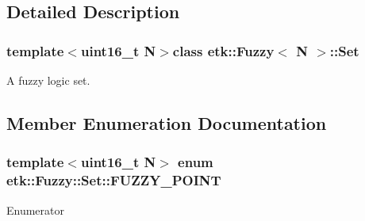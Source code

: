 \subsection{Detailed Description}
\subsubsection*{template$<$uint16\-\_\-t N$>$class etk\-::\-Fuzzy$<$ N $>$\-::\-Set}

A fuzzy logic set. 

\subsection{Member Enumeration Documentation}
\hypertarget{classetk_1_1_fuzzy_1_1_set_a458bba0e19aa05ab891962a705243a97}{
\subsubsection[{F\-U\-Z\-Z\-Y\-\_\-\-P\-O\-I\-N\-T}]{\setlength{\rightskip}{0pt plus 5cm}template$<$uint16\-\_\-t N$>$ enum {\bf etk\-::\-Fuzzy\-::\-Set\-::\-F\-U\-Z\-Z\-Y\-\_\-\-P\-O\-I\-N\-T}\hspace{0.3cm}{\ttfamily [protected]}}}\label{classetk_1_1_fuzzy_1_1_set_a458bba0e19aa05ab891962a705243a97}
\begin{Desc}
\item[Enumerator]\par
\begin{description}
\item[{\em 
\hypertarget{classetk_1_1_fuzzy_1_1_set_a458bba0e19aa05ab891962a705243a97ac8fc7790d2c5d6719b755e21658d60f5}{S\-T\-A\-R\-T}\label{classetk_1_1_fuzzy_1_1_set_a458bba0e19aa05ab891962a705243a97ac8fc7790d2c5d6719b755e21658d60f5}
}]\item[{\em 
\hypertarget{classetk_1_1_fuzzy_1_1_set_a458bba0e19aa05ab891962a705243a97a622f9b497afa3b59681c1875936788ee}{M\-I\-D}\label{classetk_1_1_fuzzy_1_1_set_a458bba0e19aa05ab891962a705243a97a622f9b497afa3b59681c1875936788ee}
}]\item[{\em 
\hypertarget{classetk_1_1_fuzzy_1_1_set_a458bba0e19aa05ab891962a705243a97a58517baf34b39d08da1c1a184d872856}{E\-N\-D}\label{classetk_1_1_fuzzy_1_1_set_a458bba0e19aa05ab891962a705243a97a58517baf34b39d08da1c1a184d872856}
}]\end{description}
\end{Desc}


